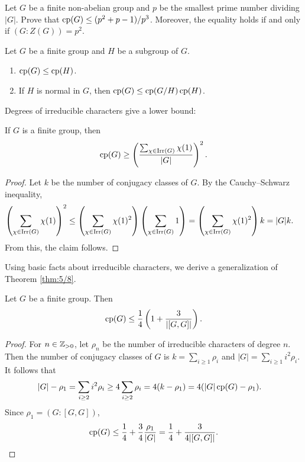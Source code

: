 \begin{exercise}
\label{xca:least_p}
    Let $G$ be a finite non-abelian group and $p$ be the smallest prime number
    dividing $|G|$. Prove that $\operatorname{cp}(G)\leq (p^2+p-1)/p^3$. Moreover, 
    the equality holds if and only if $(G:Z(G))=p^2$. 
\end{exercise}

\begin{bonus}
\label{xca:cp(G)}
    Let $G$ be a finite group and $H$ be a subgroup of $G$.
    \begin{enumerate}
        \item $\operatorname{cp}(G)\leq\operatorname{cp}(H)$.
        \item If $H$ is normal in $G$, then $\operatorname{cp}(G)\leq\operatorname{cp}(G/H)\operatorname{cp}(H)$.
    \end{enumerate}
\end{bonus}

Degrees of irreducible characters give a lower bound:

\begin{proposition}
If $G$ is a finite group, then
\[
\operatorname{cp}(G)\geq\left(\frac{\sum_{\chi\in\operatorname{Irr}(G)}\chi(1)}{|G|}\right)^2.
\]
\end{proposition}

\begin{proof}
    Let $k$ be the number of conjugacy classes of $G$.
    By the Cauchy--Schwarz inequality, 
    \begin{align*}
        \left(\sum_{\chi\in\operatorname{Irr}(G)}\chi(1)\right)^2
        &\leq\left(\sum_{\chi\in\operatorname{Irr}(G)}\chi(1)^2\right)\left(\sum_{\chi\in\operatorname{Irr}(G)}1\right)
        =\left(\sum_{\chi\in\operatorname{Irr}(G)}\chi(1)^2\right)k=|G|k.
    \end{align*}
    From this, the claim follows.
\end{proof}

Using basic facts about irreducible characters, we derive a generalization of Theorem \ref{thm:5/8}.

\begin{theorem}
\label{thm:[GG]}
    Let $G$ be a finite group. Then
    \[
        \operatorname{cp}(G)\leq\frac14\left(1+\frac3{|[G,G]|}\right).
    \]
\end{theorem}

\begin{proof}
    For $n\in\mathbb{Z}_{>0}$, let $\rho_n$ be the number
    of irreducible characters of degree $n$. Then 
    the number of conjugacy classes of $G$ is $k=\sum_{i\geq1}\rho_i$
    and $|G|=\sum_{i\geq1}i^2\rho_i$. 
    It follows that 
    \begin{align*}
    |G|-\rho_1 &=\sum_{i\geq 2}i^2\rho_i\geq 4\sum_{i\geq2}\rho_i
    =4(k-\rho_1)=4(|G|\operatorname{cp}(G)-\rho_1).
    \end{align*}
    Since $\rho_1=(G:[G,G])$, 
    \[
    \operatorname{cp}(G)\leq \frac14+\frac34\frac{\rho_1}{|G|}=\frac14+\frac3{4|[G,G]|}.\qedhere 
    \]
\end{proof}

